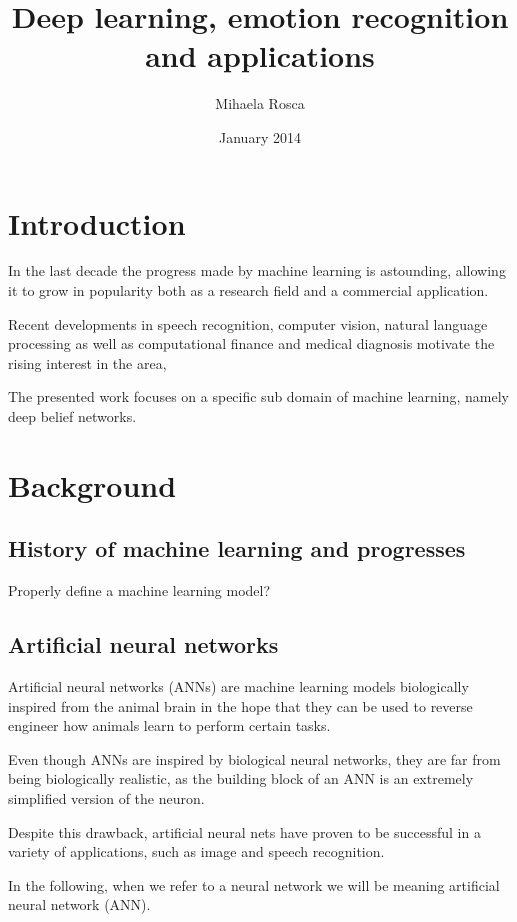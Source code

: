 \documentclass[11pt, fleqn, twoside]{article}
\title{Deep learning, emotion recognition and applications}
\author{Mihaela Rosca}
\date{January 2014}
\begin{document}
\maketitle
\tableofcontents
\listoffigures

\section{Introduction}
  In the last decade the progress made by machine learning is astounding, allowing it to grow in popularity both as a research field  and a commercial application.

  Recent developments in speech recognition, computer vision, natural language processing as well as computational finance and medical diagnosis motivate the rising interest in the area,

  The presented work focuses on a specific sub domain of machine learning, namely deep belief networks.







\section{Background}

\subsection{History of machine learning and progresses}
 Properly define a machine learning model?

\subsection{Artificial neural networks}

  Artificial neural networks (ANNs) are machine learning models biologically inspired from the animal brain in the hope that they can be used to reverse engineer how animals learn to perform certain tasks.

  Even though ANNs are inspired by biological neural networks, they are far from being biologically realistic, as the building block of an ANN is an extremely simplified version of the neuron.

  Despite this drawback, artificial neural nets have proven to be successful in a variety of applications, such as image and speech recognition.

  In the following, when we refer to a neural network we will be meaning artificial neural network (ANN).
\end{document}

